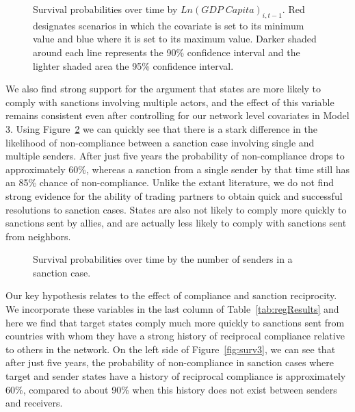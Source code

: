 \begin{figure}[ht]
	\centering
	\caption{Survival probabilities over time by $Ln(GDP \; Capita)_{i,t-1}$. Red designates scenarios in which the covariate is set to its minimum value and blue where it is set to its maximum value. Darker shaded around each line represents the 90\% confidence interval and the lighter shaded area the 95\% confidence interval.}

        \resizebox{.55\textwidth}{!}{}	


	
	\label{fig:monSurv}
\end{figure}

We also find strong support for the argument that states are more likely to comply with sanctions involving multiple actors, and the effect of this variable remains consistent even after controlling for our network level covariates in Model 3. Using Figure~\ref{fig:nosSurv} we can quickly see that there is a stark difference in the likelihood of non-compliance between a sanction case involving single and multiple senders. After just five years the probability of non-compliance drops to approximately 60\%, whereas a sanction from a single sender by that time still has an 85\% chance of non-compliance. Unlike the extant literature, we do not find strong evidence for the ability of trading partners to obtain quick and successful resolutions to sanction cases. States are also not likely to comply more quickly to sanctions sent by allies, and are actually less likely to comply with sanctions sent from neighbors. 

\begin{figure}[ht]
	\centering
	\caption{Survival probabilities over time by the number of senders in a sanction case.}
	\resizebox{0.55\textwidth}{!}{}
	\label{fig:nosSurv}
\end{figure}

Our key hypothesis relates to the effect of compliance and sanction reciprocity. We incorporate these variables in the last column of Table~\ref{tab:regResults} and here we find that target states comply much more quickly to sanctions sent from countries with whom they have a strong history of reciprocal compliance relative to others in the network. On the left side of Figure~\ref{fig:surv3}, we can see that after just five years, the probability of non-compliance in sanction cases where target and sender states have a history of reciprocal compliance is approximately 60\%, compared to about 90\% when this history does not exist between senders and receivers. 

